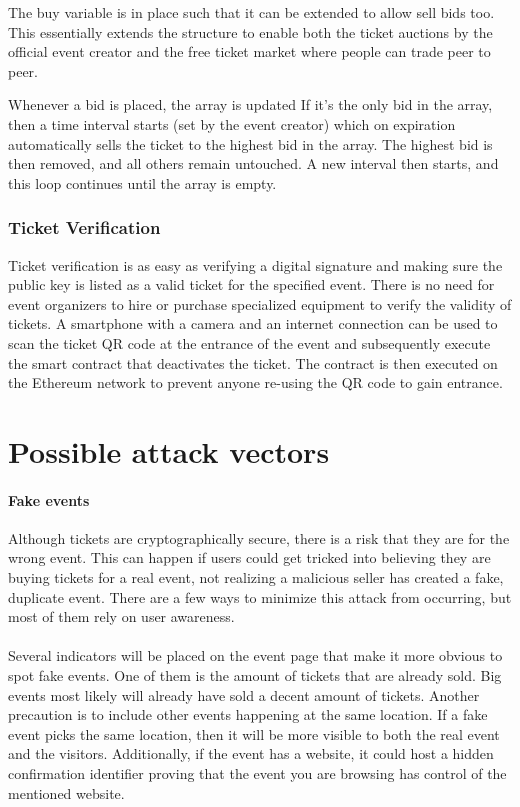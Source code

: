 \documentclass[a4paper]{article}
\begin{document}
The buy variable is in place such that it can be extended to allow sell bids too. This essentially extends the structure to enable both the ticket auctions by the official event creator and the free ticket market where people can trade peer to peer. 

Whenever a bid is placed, the array is updated If it's the only bid in the array, then a time interval starts (set by the event creator) which on expiration automatically sells the ticket to the highest bid in the array. The highest bid is then removed, and all others remain untouched. A new interval then starts, and this loop continues until the array is empty.

\subsubsection{Ticket Verification}

Ticket verification is as easy as verifying a digital signature and making sure the public key is listed as a valid ticket for the specified event. There is no need for event organizers to hire or purchase specialized equipment to verify the validity of tickets. A smartphone with a camera and an internet connection can be used to scan the ticket QR code at the entrance of the event and subsequently execute the smart contract that deactivates the ticket. The contract is then executed on the Ethereum network to prevent anyone re-using the QR code to gain entrance.


\section{Possible attack vectors}
\paragraph{Fake events} Although tickets are cryptographically secure, there is a risk that they are for the wrong event. This can happen if users could get tricked into believing they are buying tickets for a real event, not realizing a malicious seller has created a fake, duplicate event. There are a few ways to minimize this attack from occurring, but most of them rely on user awareness.

\paragraph{} Several indicators will be placed on the event page that make it more obvious to spot fake events. One of them is the amount of tickets that are already sold. Big events most likely will already have sold a decent amount of tickets. Another precaution is to include other events happening at the same location. If a fake event picks the same location, then it will be more visible to both the real event and the visitors. Additionally, if the event has a website, it could host a hidden confirmation identifier proving that the event you are browsing has control of the mentioned website. 
\end{document}

